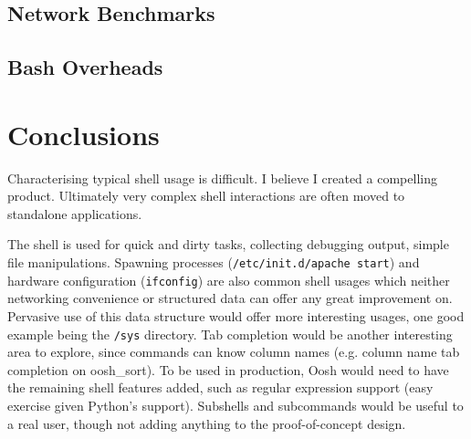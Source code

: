 \documentclass[12pt,twoside,notitlepage]{report}
\begin{document}
\section{Network Benchmarks}

\section{Bash Overheads}



\cleardoublepage
\chapter{Conclusions}


Characterising typical shell usage is difficult. I believe I created a
compelling product. Ultimately very complex shell interactions are often moved
to standalone applications. %

The shell is used for quick and dirty tasks, collecting debugging output, simple
file manipulations. Spawning processes ({\tt /etc/init.d/apache start}) and
hardware configuration ({\tt ifconfig}) are also common shell usages which
neither networking convenience or structured data can offer any great
improvement on. Pervasive use of this data structure would offer more
interesting usages, one good example being the {\tt /sys} directory. Tab
completion would be another interesting area to explore, since commands can know
column names (e.g. column name tab completion on oosh\_sort). To be used in
production, Oosh would need to have the remaining shell features added, such as
regular expression support (easy exercise given Python's support). Subshells and
subcommands would be useful to a real user, though not adding anything to the
proof-of-concept design.

\end{document}
